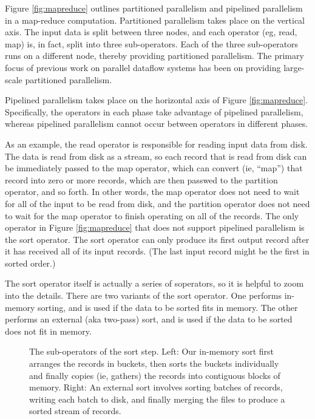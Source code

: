 \documentclass{acm_proc_article-sp}
\begin{document}
Figure \ref{fig:mapreduce} outlines partitioned parallelism and pipelined parallelism in a map-reduce computation. Partitioned parallelism takes place on the vertical axis. The input data is split between three nodes, and each operator (eg, read, map) is, in fact, split into three sub-operators. Each of the three sub-operators runs on a different node, thereby providing partitioned parallelism. The primary focus of previous work on parallel dataflow systems has been on providing large-scale partitioned parallelism.

Pipelined parallelism takes place on the horizontal axis of Figure \ref{fig:mapreduce}. Specifically, the operators in each phase take advantage of pipelined parallelism, whereas pipelined parallelism cannot occur between operators in different phases.

As an example, the read operator is responsible for reading input data from disk. The data is read from disk as a stream, so each record that is read from disk can be immediately passed to the map operator, which can convert (ie, ``map'') that record into zero or more records, which are then passwed to the partition operator, and so forth. In other words, the map operator does not need to wait for all of the input to be read from disk, and the partition operator does not need to wait for the map operator to finish operating on all of the records. The only operator in Figure \ref{fig:mapreduce} that does not support pipelined parallelism is the sort operator. The sort operator can only produce its first output record after it has received all of its input records. (The last input record might be the first in sorted order.)

The sort operator itself is actually a series of soperators, so it is helpful to zoom into the details. There are two variants of the sort operator. One performs in-memory sorting, and is used if the data to be sorted fits in memory. The other performs an external (aka two-pass) sort, and is used if the data to be sorted does not fit in memory.

\begin{figure}
\caption{The sub-operators of the sort step. Left: Our in-memory sort first arranges the records in buckets, then sorts the buckets individually and finally copies (ie, gathers) the records into contiguous blocks of memory. Right: An external sort involves sorting batches of records, writing each batch to disk, and finally merging the files to produce a sorted stream of records.}
\label{fig:sort}
\end{figure}
\end{document}
